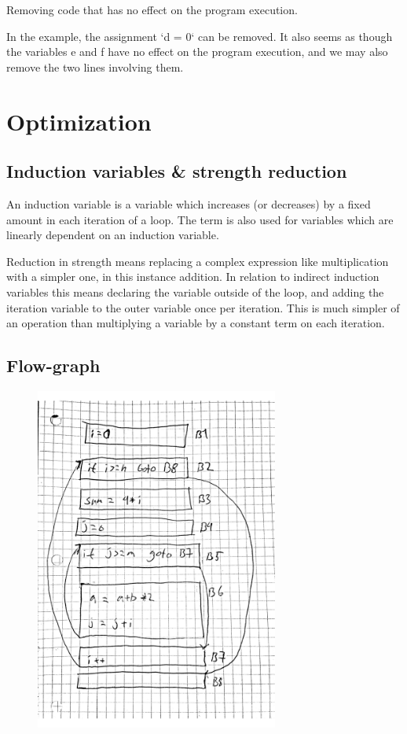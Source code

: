 \documentclass[paper=a4, fontsize=11pt]{scrartcl} %
\numberwithin{equation}{section} %
\numberwithin{figure}{section} %
\numberwithin{table}{section} %
\begin{document}
Removing code that has no effect on the program execution.

In the example, the assignment `d = 0` can be removed.
It also seems as though the variables e and f have no effect on the program execution, and we may also remove the two lines involving them.

\section{Optimization}

\subsection{Induction variables \& strength reduction}
An induction variable is a variable which increases (or decreases) by a fixed amount in each iteration of a loop. The term is also used for variables which are linearly dependent on an induction variable.

Reduction in strength means replacing a complex expression like multiplication with a simpler one, in this instance addition.
In relation to indirect induction variables this means declaring the variable outside of the loop, and adding the iteration variable to the outer variable once per iteration. This is much simpler of an operation than multiplying a variable by a constant term on each iteration.

\subsection{Flow-graph}

\begin{figure}[ht!]
\centering
\includegraphics[width=80mm]{2b.pdf}
\end{figure}
\end{document}
